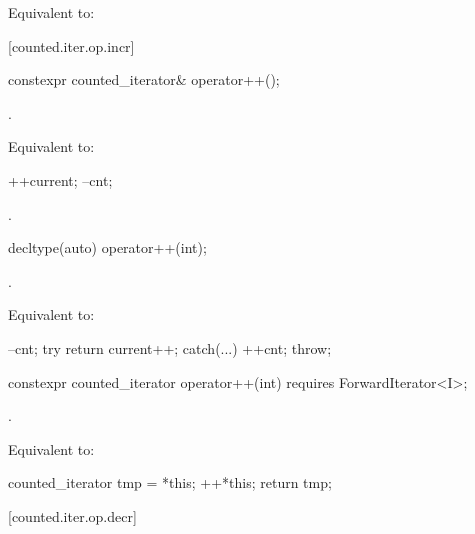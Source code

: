 \begin{addedblock}
\begin{itemdescr}
\pnum
\effects Equivalent to: 
\end{itemdescr}

[counted.iter.op.incr]{}

%
%
\begin{itemdecl}
constexpr counted_iterator& operator++();
\end{itemdecl}

\begin{itemdescr}
\pnum
\expects {}.

\pnum
\effects Equivalent to:
\begin{codeblock}
++current;
--cnt;
\end{codeblock}

\pnum
\returns {}.
\end{itemdescr}

%
%
\begin{itemdecl}
decltype(auto) operator++(int);
\end{itemdecl}

\begin{itemdescr}
\pnum
\expects {}.

\pnum
\effects Equivalent to:
\begin{codeblock}
--cnt;
try { return current++; }
catch(...) { ++cnt; throw; }
\end{codeblock}
\end{itemdescr}

\begin{itemdecl}
constexpr counted_iterator operator++(int)
  requires ForwardIterator<I>;
\end{itemdecl}

\begin{itemdescr}
\pnum
\expects {}.

\pnum
\effects Equivalent to:
\begin{codeblock}
counted_iterator tmp = *this;
++*this;
return tmp;
\end{codeblock}
\end{itemdescr}

[counted.iter.op.decr]{}


\end{addedblock}
